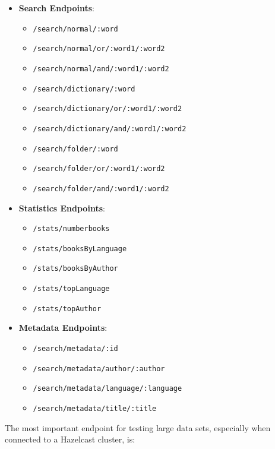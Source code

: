 \begin{itemize}
\tightlist
\item
  \textbf{Search Endpoints}:

  \begin{itemize}
  \tightlist
  \item
    \texttt{/search/normal/:word}
  \item
    \texttt{/search/normal/or/:word1/:word2}
  \item
    \texttt{/search/normal/and/:word1/:word2}
  \item
    \texttt{/search/dictionary/:word}
  \item
    \texttt{/search/dictionary/or/:word1/:word2}
  \item
    \texttt{/search/dictionary/and/:word1/:word2}
  \item
    \texttt{/search/folder/:word}
  \item
    \texttt{/search/folder/or/:word1/:word2}
  \item
    \texttt{/search/folder/and/:word1/:word2}
  \end{itemize}
\item
  \textbf{Statistics Endpoints}:

  \begin{itemize}
  \tightlist
  \item
    \texttt{/stats/numberbooks}
  \item
    \texttt{/stats/booksByLanguage}
  \item
    \texttt{/stats/booksByAuthor}
  \item
    \texttt{/stats/topLanguage}
  \item
    \texttt{/stats/topAuthor}
  \end{itemize}
\item
  \textbf{Metadata Endpoints}:

  \begin{itemize}
  \tightlist
  \item
    \texttt{/search/metadata/:id}
  \item
    \texttt{/search/metadata/author/:author}
  \item
    \texttt{/search/metadata/language/:language}
  \item
    \texttt{/search/metadata/title/:title}
  \end{itemize}
\end{itemize}

The most important endpoint for testing large data sets, especially when
connected to a Hazelcast cluster, is:

